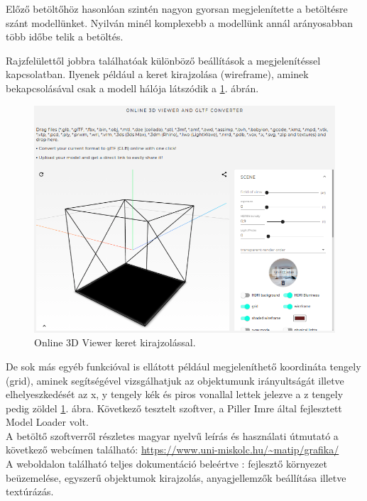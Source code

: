 Előző betöltőhöz hasonlóan szintén nagyon gyorsan megjelenítette a betöltésre szánt modellünket. Nyilván minél komplexebb a modellünk annál arányosabban több időbe telik a betöltés.

\newpage
Rajzfelülettől jobbra találhatóak különböző beállítások a megjelenítéssel kapcsolatban. Ilyenek például a keret kirajzolása (wireframe), aminek bekapcsolásával csak a modell hálója látszódik a \ref{fig:3d3}. ábrán.
\begin{figure}[h]
\bigskip
\centering
\includegraphics[width=\textwidth]{images/3D_creators_4.png}
\caption{Online 3D Viewer keret kirajzolással.}
\label{fig:3d3}
\end{figure}
\bigskip

De sok más egyéb funkcióval is ellátott például megjeleníthető koordináta tengely (grid), aminek segítségével vizsgálhatjuk az objektumunk irányultságát illetve elhelyeszkedését az x, y tengely kék és piros vonallal lettek jelezve a z tengely pedig zöldel  \ref{fig:3d3}. ábra.
\newpage
{}
Következő tesztelt szoftver, a Piller Imre által fejlesztett Model Loader volt.\cite{imre2020model}\\

\noindent A betöltő szoftverről részletes magyar nyelvű leírás és használati útmutató a következő webcímen található: \url{https://www.uni-miskolc.hu/~matip/grafika/}\\

A weboldalon található teljes dokumentáció beleértve : fejlesztő környezet beüzemelése, egyszerű objektumok kirajzolás, anyagjellemzők beállítása illetve textúrázás.\\

